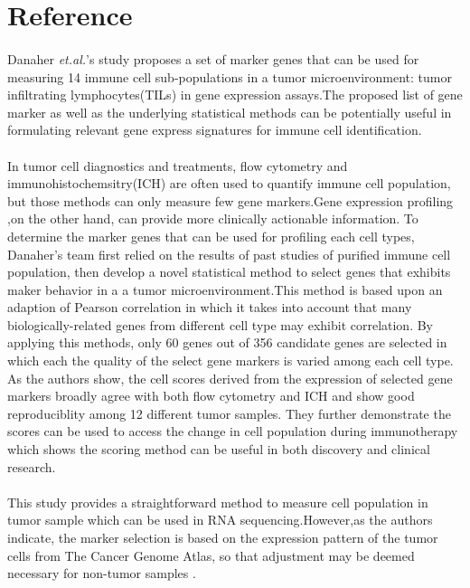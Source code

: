 \documentclass{article}
\begin{document}
%
\section*{Reference}{
\medskip
{}}
\medskip


\paragraph{}
Danaher \textit{et.al.}'s study proposes a set of marker genes that can be used for measuring 14 immune cell sub-populations in a tumor microenvironment: tumor infiltrating lymphocytes(TILs) in gene expression assays.The proposed list of gene marker as well as the underlying statistical methods can be potentially useful in formulating relevant gene express signatures for immune cell identification. \\

\paragraph{}
In tumor cell diagnostics and treatments, flow cytometry and immunohistochemsitry(ICH) are often used to quantify immune cell population, but those methods can only measure few gene markers.Gene expression profiling ,on the other hand, can provide more clinically actionable information. To determine the marker genes that can be used for profiling each cell types, Danaher's team first relied on the results of past studies of purified immune cell population, then develop a novel statistical method to select genes that exhibits maker behavior in a a tumor microenvironment.This method is based upon an adaption of Pearson correlation in which it takes into account that many biologically-related genes from different cell type may exhibit correlation. By applying this methods, only 60 genes out of 356 candidate genes are selected in which each the quality of the select gene markers is varied among each cell type. As the authors show, the cell scores derived from the expression of selected gene markers broadly agree with both flow cytometry and ICH and show good reproduciblity among 12 different tumor samples. They further demonstrate the scores  
can be used to access the change in cell population during immunotherapy which shows the scoring method can be useful in both discovery and clinical research.\\

\paragraph{}
This study provides a straightforward method to measure cell population in tumor sample which can be used in RNA sequencing.However,as the authors indicate, the marker selection is based on the expression pattern of the tumor cells from The Cancer Genome Atlas, so that adjustment may be deemed necessary for non-tumor samples . 
\end{document}

